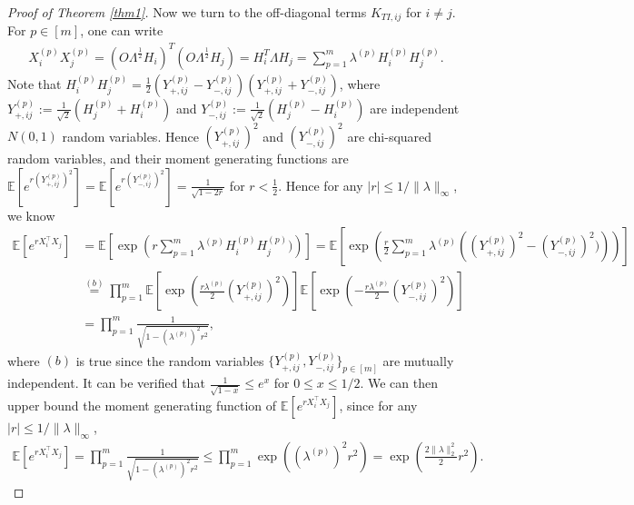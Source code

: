 \documentclass{article}
\theoremstyle{plain}
\theoremstyle{definition}
\theoremstyle{remark}
\begin{document}
\begin{proof}[Proof of Theorem \ref{thm1}]
Now we turn to the off-diagonal terms $K_{TI, ij}$ for $i \neq j$. For $p \in [m]$, one can write
\begin{align*}
    X_i^{(p)} X_j^{(p)} = (O \Lambda^{\frac{1}{2}} H_i)^T(O \Lambda^{\frac{1}{2}} H_j) = H_i^T \Lambda H_j = \sum_{p=1}^m \lambda^{(p)} H_i^{(p)} H_j^{(p)}.
\end{align*}
Note that $H_i^{(p)} H_j^{(p)} = \frac{1}{2} (Y_{+,ij}^{(p)} - Y_{-,ij}^{(p)}) (Y_{+,ij}^{(p)} + Y_{-,ij}^{(p)})$, where $Y_{+,ij}^{(p)}:= \frac{1}{\sqrt{2}} (H_j^{(p)} + H_i^{(p)})$ and $Y_{-,ij}^{(p)}:= \frac{1}{\sqrt{2}} (H_j^{(p)} - H_i^{(p)})$ are independent $N(0,1)$ random variables. Hence $(Y_{+,ij}^{(p)})^2$ and $(Y_{-,ij}^{(p)})^2$ are chi-squared random variables, and their moment generating functions are
$\mathbb{E}[e^{r (Y_{+,ij}^{(p)})^2}] = \mathbb{E}[e^{r (Y_{-,ij}^{(p)})^2}] = \frac{1}{\sqrt{1 - 2 r}}$ for $r < \frac{1}{2}$. Hence for any $|r| \leq 1/\|\lambda\|_\infty$, we know
\begin{align*}
    \mathbb{E}[e^{r X_i^\top X_j}] &= \mathbb{E}\left[\exp \left(r \sum_{p=1}^m \lambda^{(p)} H_i^{(p)} H_j^{(p)} )\right)\right]
     = \mathbb{E}\left[\exp \left(\frac{r}{2} \sum_{p=1}^m \lambda^{(p)} \left((Y_{+,ij}^{(p)})^2 - (Y_{-,ij}^{(p)})^2)\right)\right)\right] \\
    &\stackrel{(b)}{=} \prod_{p=1}^m \mathbb{E}\left[\exp(\frac{r \lambda^{(p)}}{2} (Y_{+,ij}^{(p)})^2)\right]\mathbb{E}\left[\exp(-\frac{r \lambda^{(p)}}{2} (Y_{-,ij}^{(p)})^2) \right] \\
    &= \prod_{p=1}^m \frac{1}{\sqrt{1 - (\lambda^{(p)})^2 r^2}},
\end{align*}
where $(b)$ is true since the random variables $\{ Y_{+,ij}^{(p)}, Y_{-,ij}^{(p)} \}_{p \in [m]}$ are mutually independent. It can be verified that $\frac{1}{\sqrt{1 - x}} \leq e^{x}$ for $0 \leq x \leq 1/2$. We can then upper bound the moment generating function of $ \mathbb{E}[e^{r X_i^\top X_j}]$, since for any $|r| \leq 1/ \|\lambda\|_\infty$, 
\begin{align*}
     \mathbb{E}[e^{r X_i^\top X_j}] = \prod_{p=1}^m \frac{1}{\sqrt{1 - (\lambda^{(p)})^2 r^2}} \leq \prod_{p=1}^m \exp\left((\lambda^{(p)})^2 r^2 \right) = \exp\left( \frac{2\|\lambda\|_2^2}{2} r^2 \right).
\end{align*}


\end{proof}
\end{document}
